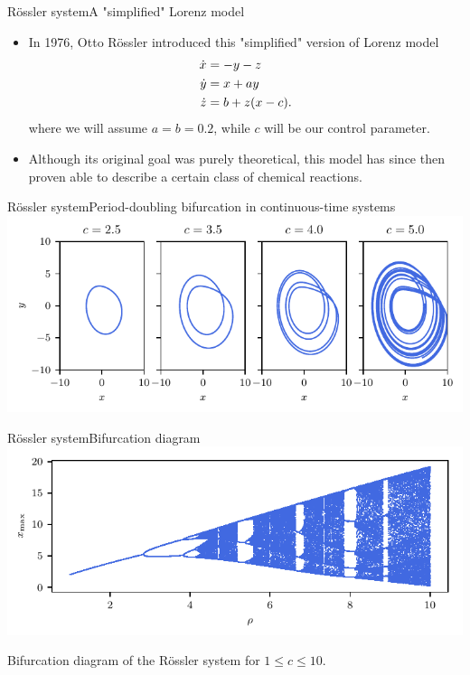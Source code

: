 \documentclass[usenames,dvipsnames,svgnames,10pt,aspectratio=169]{beamer}
\begin{document}
\begin{frame}[t, c]{R\"ossler system}{A "simplified" Lorenz model}
	\begin{itemize}
		\item In 1976, Otto R\"ossler introduced this "simplified" version of Lorenz model
		\begin{equation}
			\begin{aligned}
				\dot{x} & = -y -z \\
				\dot{y} & = x + a y \\
				\dot{z} & = b + z(x-c).
			\end{aligned}
			\notag
		\end{equation}
		where we will assume $a=b=0.2$, while $c$ will be our control parameter.

		\bigskip

		\item Although its original goal was purely theoretical, this model has since then proven able to describe a certain class of chemical reactions.
	\end{itemize}

	\vspace{1cm}
\end{frame}

\begin{frame}[t, c]{R\"ossler system}{Period-doubling bifurcation in continuous-time systems}
	\centering
	\includegraphics[width=.75\textwidth]{rossler_system_period_doubling}

	\vspace{1cm}
\end{frame}

\begin{frame}[t, c]{R\"ossler system}{Bifurcation diagram}
	\centering
	\includegraphics[width=.75\textwidth]{rossler_bifurcation_diagram}

	Bifurcation diagram of the R\"ossler system for $1 \leq c \leq 10$.

	\vspace{1cm}
\end{frame}
\end{document}
